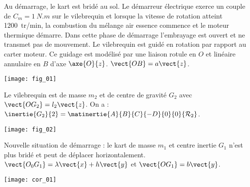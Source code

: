 \ifprof
\else
\begin{multicols}{2}
\fi

\ifprof
\else
Au démarrage, le kart est bridé au sol. Le démarreur électrique exerce un couple de $C_m = \SI{1}{N.m}$ sur le vilebrequin et lorsque la vitesse de rotation atteint \SI{1200}{tr/min}, la combustion du mélange air essence commence et le moteur thermique démarre. Dans cette phase de démarrage l’embrayage est ouvert et ne transmet pas de mouvement.
Le vilebrequin est guidé en rotation par rapport au carter moteur. Ce guidage est modélisé par une liaison rotule en $O$ et linéaire annulaire en $B$ d’axe $\axe{O}{z}$. $\vect{OB}=a\vect{z}$.


\begin{center}
\texttt{[image: fig\_01]}
\end{center}

Le vilebrequin est de masse $m_2$ et de centre de gravité $G_2$ avec $\vect{OG_2}=l_2\vect{z}$. On a : $\inertie{G_2}{2}=\matinertie{A}{B}{C}{-D}{0}{0}{\mathcal{R}_2}$.
\begin{center}
\texttt{[image: fig\_02]}
\end{center}



Nouvelle situation de démarrage : le kart de masse $m_1$ et centre inertie $G_1$ n’est plus bridé et peut de déplacer horizontalement. $\vect{O_0 G_1}=\lambda \vect{x}+h\vect{y}$ et $\vect{OG_1}=b\vect{y}$.






\ifprof
\else
\end{multicols}
\fi


\fi

\ifprof
\begin{center}
\texttt{[image: cor\_01]}
\end{center}

